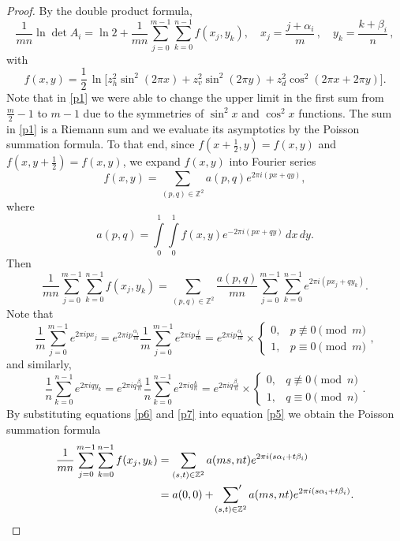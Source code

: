 \documentclass[12pt,reqno]{amsart}
\numberwithin{equation}{section}
\newcommand{\Z}{{\mathbb Z}}
\newcommand{\al}{\alpha}
\newcommand{\be}{\beta}
\begin{document}
\begin{proof}
\noindent By the double product formula,
\begin{equation}\label{p1}
\frac{1}{mn}\ln\det A_i=\ln 2+\frac{1}{mn}\sum_{j=0}^{m-1}\sum_{k=0}^{n-1}
f(x_j,y_k),\quad x_j=\frac{j+\al_{i}}{m}\,,\quad y_k=\frac{k+\be_{i}}{n}\,,
\end{equation}
with
\begin{equation}\label{p2}
f(x,y)=\frac{1}{2}\,\ln\big[z_h^2 \sin^2 (2\pi x)
+z_v^2 \sin^2 (2\pi y)
+z_d^2\cos^2 (2\pi x+2\pi y)\big].
\end{equation}
Note that in \eqref{p1} we were able to change the upper limit in the first sum from $\frac{m}{2}-1$ to $m-1$ due to the symmetries of $\sin^2 x$ and $\cos^2 x$ functions.
The sum in \eqref{p1} is a Riemann sum and we evaluate its asymptotics by the Poisson summation formula.
To that end, since $f(x+\frac{1}{2},y)=f(x,y)$ and $f(x,y+\frac{1}{2})=f(x,y)$, we expand $f(x,y)$ into Fourier series 
\begin{equation}\label{p3}
f(x,y)=\sum_{(p,q)\in\Z^2} a(p,q) e^{2\pi i (px+qy)},
\end{equation}
where
\begin{equation}\label{p4}
a(p,q)=\int\limits_0^1\int\limits_0^1 f(x,y)e^{-2\pi i (px+qy)}\,dx\,dy.
\end{equation}
Then
\begin{equation}\label{p5}
\frac{1}{mn}\sum_{j=0}^{m-1}\sum_{k=0}^{n-1}
f(x_j,y_k)=\sum_{(p,q)\in\Z^2}\frac{a(p,q)}{mn}\sum_{j=0}^{m-1}\sum_{k=0}^{n-1}
  e^{2\pi i (px_j+qy_k)}.
\end{equation}
Note that
\begin{equation}\label{p6}
\frac{1}{m}\sum_{j=0}^{m-1}e^{2\pi i px_j}=e^{2\pi i p\frac{\al_{i}}{m}}\frac{1}{m}\sum_{j=0}^{m-1}e^{2\pi i p\frac{j}{m}}=e^{2\pi i p\frac{\al_{i}}{m}}\times\begin{cases}0,&p\not\equiv 0\pmod m\\ 1,&p\equiv 0\pmod m\end{cases},
\end{equation}
and similarly, 
\begin{equation}\label{p7}
\frac{1}{n}\sum_{k=0}^{n-1}e^{2\pi i qy_k}=e^{2\pi i q\frac{\be_{i}}{n}}\frac{1}{n}\sum_{k=0}^{n-1}e^{2\pi i q\frac{k}{n}}=e^{2\pi i q\frac{\be_{i}}{n}}\times\begin{cases}0,&q\not\equiv 0\pmod n\\ 1,&q\equiv 0\pmod n\end{cases}.
\end{equation}
By substituting equations \eqref{p6} and \eqref{p7} into equation \eqref{p5} we obtain the Poisson summation formula
\begin{equation}\label{p8}
\begin{aligned}
\frac{1}{mn}\sum_{j=0}^{m-1}\sum_{k=0}^{n-1}
f(x_j,y_k)&=\sum_{(s,t)\in\Z^2}a(ms,nt)e^{2\pi i (s\al_{i}+t\be_{i})}\\
&=a(0,0)+\sideset{}{'}\sum_{(s,t)\in\Z^2}a(ms,nt)e^{2\pi i (s\al_{i}+t\be_{i})}.
\end{aligned}
\end{equation}


\end{proof}
\end{document}
